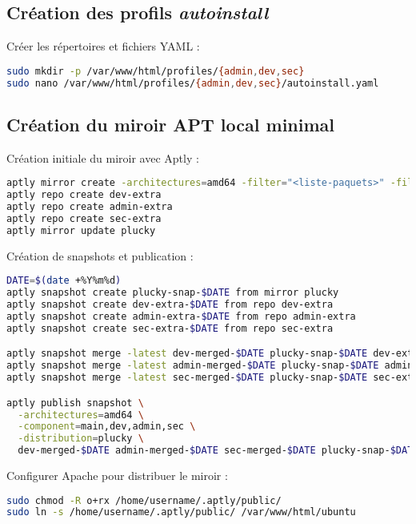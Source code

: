 \documentclass[a4paper,12pt]{article}
\begin{document}
\subsection{Création des profils \textit{autoinstall}}

Créer les répertoires et fichiers YAML :

\begin{lstlisting}[language=bash]
sudo mkdir -p /var/www/html/profiles/{admin,dev,sec}
sudo nano /var/www/html/profiles/{admin,dev,sec}/autoinstall.yaml
\end{lstlisting}

\subsection{Création du miroir APT local minimal}

Création initiale du miroir avec Aptly :

\begin{lstlisting}[language=bash]
aptly mirror create -architectures=amd64 -filter="<liste-paquets>" -filter-with-deps plucky http://archive.ubuntu.com/ubuntu plucky
aptly repo create dev-extra
aptly repo create admin-extra
aptly repo create sec-extra
aptly mirror update plucky
\end{lstlisting}

Création de snapshots et publication :

\begin{lstlisting}[language=bash]
DATE=$(date +%Y%m%d)
aptly snapshot create plucky-snap-$DATE from mirror plucky
aptly snapshot create dev-extra-$DATE from repo dev-extra
aptly snapshot create admin-extra-$DATE from repo admin-extra
aptly snapshot create sec-extra-$DATE from repo sec-extra

aptly snapshot merge -latest dev-merged-$DATE plucky-snap-$DATE dev-extra-$DATE
aptly snapshot merge -latest admin-merged-$DATE plucky-snap-$DATE admin-extra-$DATE
aptly snapshot merge -latest sec-merged-$DATE plucky-snap-$DATE sec-extra-$DATE

aptly publish snapshot \
  -architectures=amd64 \
  -component=main,dev,admin,sec \
  -distribution=plucky \
  dev-merged-$DATE admin-merged-$DATE sec-merged-$DATE plucky-snap-$DATE
\end{lstlisting}

Configurer Apache pour distribuer le miroir :

\begin{lstlisting}[language=bash]
sudo chmod -R o+rx /home/username/.aptly/public/
sudo ln -s /home/username/.aptly/public/ /var/www/html/ubuntu
\end{lstlisting}
\end{document}
